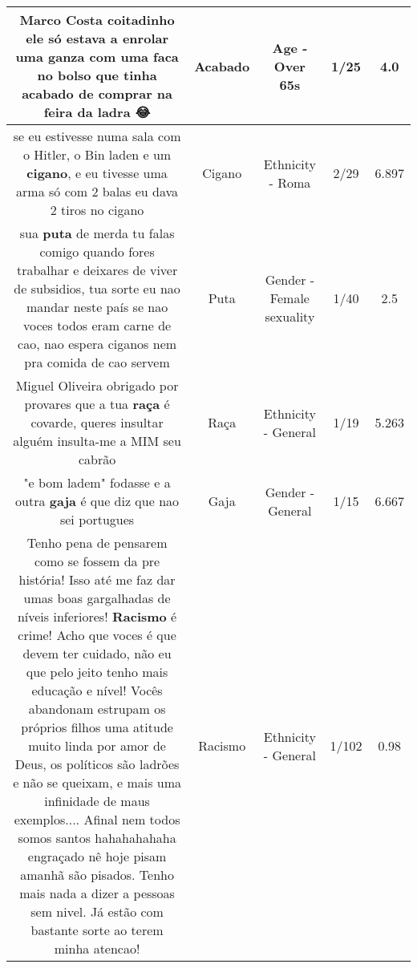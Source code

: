 \documentclass[11pt]{article}
\newlength\mylength
\begin{document}
\begin{center}
\begin{longtable}{|C{.65\mylength}|C{.30\mylength}|C{.12\mylength}|C{.12\mylength}|C{.12\mylength}|}
  \small Marco Costa coitadinho ele só estava a enrolar uma ganza com uma faca no bolso que tinha \textbf{acabado} de comprar na feira da ladra 😂\normalsize   & Acabado & Age - Over 65s & 1/25 & 4.0 \\  \hline
  \small se eu estivesse numa sala com o Hitler, o Bin laden e um \textbf{cigano}, e eu tivesse uma arma só com 2 balas eu dava 2 tiros no cigano\normalsize   & Cigano & Ethnicity - Roma & 2/29 & 6.897 \\  \hline
  \small sua \textbf{puta} de merda tu falas comigo quando fores trabalhar e deixares de viver de subsidios, tua sorte eu nao mandar neste país se nao voces todos eram carne de cao, nao espera ciganos nem pra comida de cao servem\normalsize   & Puta & Gender - Female sexuality & 1/40 & 2.5 \\  \hline
  \small Miguel Oliveira obrigado por provares que a tua \textbf{raça} é covarde, queres insultar alguém insulta-me a MIM seu cabrão\normalsize   & Raça & Ethnicity - General & 1/19 & 5.263 \\  \hline
  \small "e bom ladem" fodasse e a outra \textbf{gaja} é que diz que nao sei portugues\normalsize   & Gaja & Gender - General & 1/15 & 6.667 \\  \hline
  \small Tenho pena de pensarem como se fossem da pre história! Isso até me faz dar umas boas gargalhadas de níveis inferiores! \textbf{Racismo} é crime! Acho que voces é que devem ter cuidado, não eu que pelo jeito tenho mais educação e nível! Vocês abandonam estrupam os próprios filhos uma atitude muito linda por amor de Deus, os políticos são ladrões e não se queixam, e mais uma infinidade de maus exemplos.... Afinal nem todos somos santos hahahahahaha engraçado nê hoje pisam amanhã são pisados. Tenho mais nada a dizer a pessoas sem nivel. Já estão com bastante sorte ao terem minha atencao!\normalsize   & Racismo & Ethnicity - General & 1/102 & 0.98 \\  \hline

\end{longtable}
\end{center}
\end{document}
